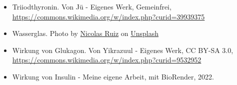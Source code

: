 \documentclass{beamer}
\begin{document}
\begin{frame}
\begin{tiny}
\begin{itemize}
\item
Triiodthyronin. Von Jü - Eigenes Werk, Gemeinfrei, \url{https://commons.wikimedia.org/w/index.php?curid=39939375}


\item
Wasserglas. Photo by \href{https://unsplash.com/@nicoruiz01981?utm_source=unsplash&utm_medium=referral&utm_content=creditCopyText}{Nicolas Ruiz} on \href{https://unsplash.com/s/photos/water-glass?utm_source=unsplash&utm_medium=referral&utm_content=creditCopyText}{Unsplash}
  

\item

Wirkung von Glukagon. Von Yikrazuul - Eigenes Werk, CC BY-SA 3.0, \url{https://commons.wikimedia.org/w/index.php?curid=9532952}

\item
Wirkung von Insulin - Meine eigene Arbeit, mit BioRender, 2022.

\end{itemize}
\end{tiny}
\end{frame}
\end{document}

